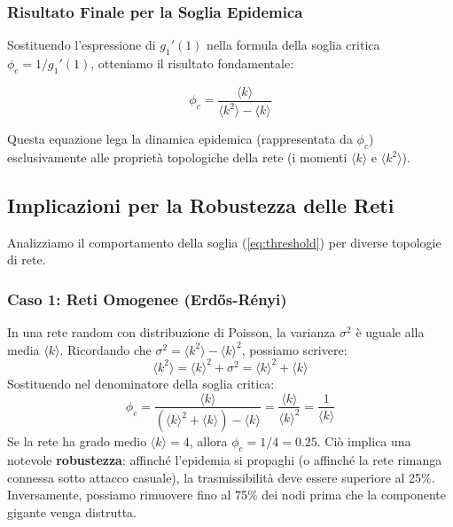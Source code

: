 \subsubsection{Risultato Finale per la Soglia Epidemica}

Sostituendo l'espressione di $g_1'(1)$ nella formula della soglia critica $\phi_c = 1/g_1'(1)$, otteniamo il risultato fondamentale:

\begin{tcolorbox}[colback=colorC!15, colframe=colorC!70!colorB,  title=\textbf{Soglia Epidemica}]
\begin{equation} \label{eq:threshold}
    \phi_c = \frac{\langle k \rangle}{\langle k^2 \rangle - \langle k \rangle}
\end{equation}
\end{tcolorbox}


Questa equazione lega la dinamica epidemica (rappresentata da $\phi_c$) esclusivamente alle proprietà topologiche della rete (i momenti $\langle k \rangle$ e $\langle k^2 \rangle$).

\subsection{Implicazioni per la Robustezza delle Reti}

Analizziamo il comportamento della soglia (\ref{eq:threshold}) per diverse topologie di rete.

\subsubsection{Caso 1: Reti Omogenee (Erdős-Rényi)}
In una rete random con distribuzione di Poisson, la varianza $\sigma^2$ è uguale alla media $\langle k \rangle$.
Ricordando che $\sigma^2 = \langle k^2 \rangle - \langle k \rangle^2$, possiamo scrivere:
\begin{equation}
    \langle k^2 \rangle = \langle k \rangle^2 + \sigma^2 = \langle k \rangle^2 + \langle k \rangle
\end{equation}
Sostituendo nel denominatore della soglia critica:
\begin{equation}
    \phi_c = \frac{\langle k \rangle}{(\langle k \rangle^2 + \langle k \rangle) - \langle k \rangle} = \frac{\langle k \rangle}{\langle k \rangle^2} = \frac{1}{\langle k \rangle}
\end{equation}
Se la rete ha grado medio $\langle k \rangle = 4$, allora $\phi_c = 1/4 = 0.25$.
Ciò implica una notevole \textbf{robustezza}: affinché l'epidemia si propaghi (o affinché la rete rimanga connessa sotto attacco casuale), la trasmissibilità deve essere superiore al 25\%. Inversamente, possiamo rimuovere fino al 75\% dei nodi prima che la componente gigante venga distrutta.

